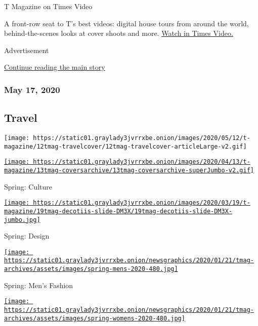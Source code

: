 T Magazine on Times Video

A front-row seat to T's best videos: digital house tours from around the
world, behind-the-scenes looks at cover shoots and more.
\href{https://www.nytimes3xbfgragh.onion/video/t-magazine}{Watch in
Times Video.}

Advertisement

\protect\hyperlink{after-mktg}{Continue reading the main story}

\hypertarget{may-17-2020}{%
\subsubsection{May 17, 2020}\label{may-17-2020}}

\href{https://www.nytimes3xbfgragh.onion/issue/t-magazine/2020/05/02/ts-may-17-travel-issue}{}

\hypertarget{travel}{%
\subsection{Travel}\label{travel}}

\texttt{[image: https://static01.graylady3jvrrxbe.onion/images/2020/05/12/t-magazine/12tmag-travelcover/12tmag-travelcover-articleLarge-v2.gif]}

\href{https://www.nytimes3xbfgragh.onion/issue/t-magazine/2020/04/12/ts-april-19-culture-issue}{\texttt{[image: https://static01.graylady3jvrrxbe.onion/images/2020/04/13/t-magazine/13tmag-coversarchive/13tmag-coversarchive-superJumbo-v2.gif]}}

Spring: Culture

\href{https://www.nytimes3xbfgragh.onion/issue/t-magazine/2020/03/06/ts-march-22-design-issue}{\texttt{[image: https://static01.graylady3jvrrxbe.onion/images/2020/03/19/t-magazine/19tmag-decotiis-slide-DM3X/19tmag-decotiis-slide-DM3X-jumbo.jpg]}}

Spring: Design

\href{https://www.nytimes3xbfgragh.onion/issue/t-magazine/2020/02/21/ts-march-8-mens-fashion-issue}{\texttt{[image: https://static01.graylady3jvrrxbe.onion/newsgraphics/2020/01/21/tmag-archives/assets/images/spring-mens-2020-480.jpg]}}

Spring: Men's Fashion

\href{https://www.nytimes3xbfgragh.onion/issue/t-magazine/2020/02/06/ts-feb-23-womens-fashion-issue}{\texttt{[image: https://static01.graylady3jvrrxbe.onion/newsgraphics/2020/01/21/tmag-archives/assets/images/spring-womens-2020-480.jpg]}}

